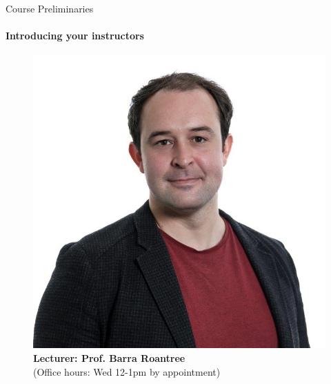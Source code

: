 \documentclass[11pt,english]{beamer}
\begin{document}
\begin{frame}{Course Preliminaries}
\framesubtitle{Introducing your instructors}
\vspace{0.2cm}

	\begin{figure}
		\begin{minipage}{0.45\textwidth}
			\centering
			\includegraphics[width=\textwidth]{headshot_roantree.jpg}
			\caption*{\textbf{Lecturer: Prof. Barra Roantree} \\ (Office hours: Wed 12-1pm by appointment)}			
		\end{minipage}
		\hfill
		\pause 
		\begin{minipage}{0.45\textwidth}
			\centering

\end{minipage}
\end{figure}
\end{frame}
\end{document}
